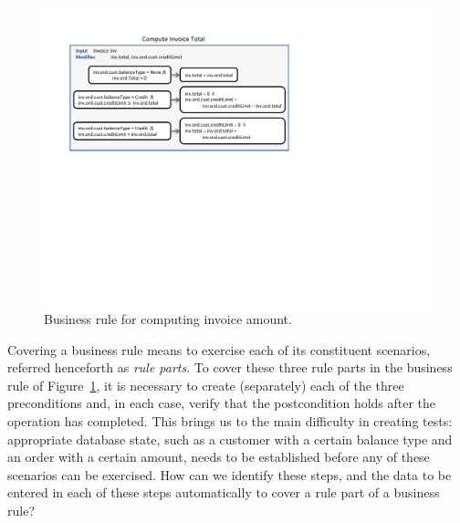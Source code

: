 \begin{figure}
\centering
\includegraphics[trim=55 320 286 54,clip,width=\columnwidth]{figs/invoice}
\vspace*{-14pt}
\caption{Business rule for computing invoice amount.}
\label{fig:invoice}
\end{figure}

Covering a business rule means to exercise each of its constituent scenarios,
referred henceforth as \textit{rule parts}.  To cover these three rule parts in
the business rule of Figure~\ref{fig:invoice}, it is necessary to create
(separately) each of the three preconditions and, in each case, verify that the
postcondition holds after the operation has completed.  This brings us to the
main difficulty in creating tests: appropriate database state, such as a
customer with a certain balance type and an order with a certain amount, needs
to be established before any of these scenarios can be exercised.  
How can we identify these steps, and the data to be entered in
each of these steps automatically to cover a rule part of a business rule?

